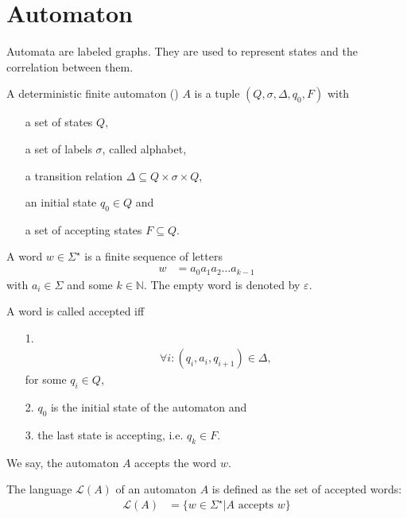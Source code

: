 \section{Automaton}\label{automaton_sec}
	Automata are labeled graphs. They are used to represent states and the correlation between them.
	\begin{mydef}\label{automaton}
		A \textnormal{deterministic finite automaton} (\dfa) $A$ is a tuple $(Q, \sigma, \Delta, q_0, F)$ with
		\begin{itemize}
			\item[] a set of states $Q$,
			\item [] a set of labels $\sigma$, called \textnormal{alphabet},
			\item[] a transition relation $\Delta \subseteq Q \times \sigma \times Q$,
			\item[] an initial state $q_0 \in Q$ and
			\item[] a set of accepting states $F \subseteq Q$.
		\end{itemize}
	\end{mydef}
	\begin{mydef}
		A \textnormal{word} $w \in \Sigma^{\star}$ is a finite sequence of letters
		\begin{align*}
			w	&= a_0a_1a_2 \ldots a_{k - 1}
		\end{align*}
		with $a_i \in \Sigma$ and some $k \in \mathbb{N}$. The empty word is denoted by $\varepsilon$.
		
		A word is called \textnormal{accepted} iff
		\begin{itemize}
			\item[1.] \begin{align*}
					\forall i: (q_i, a_i, q_{i + 1}) \in \Delta,
				\end{align*}
				for some $q_i \in Q$,
			\item[2.] $q_0$ is the initial state of the automaton and
			\item[3.] the last state is accepting, i.e. $q_k \in F$.
		\end{itemize}
		We say, the automaton $A$ accepts the word $w$.
	\end{mydef}
	\begin{mydef}
		The language $\mathcal{L}(A)$ of an automaton $A$ is defined as the set of accepted words:
		\begin{align*}
			\mathcal{L}(A)	&= \{w \in \Sigma^{\star} | A \text{ accepts } w\}
		\end{align*}
	\end{mydef}\quad\\
